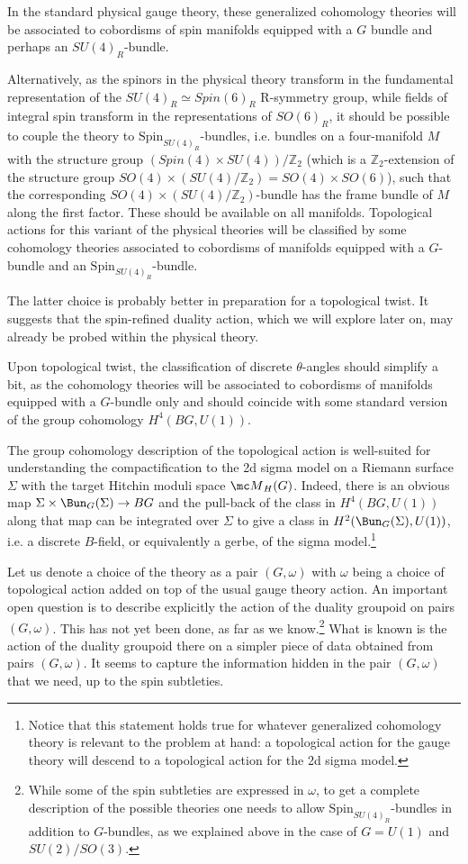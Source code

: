 \documentclass[11pt,reqno]{amsart}
\theoremstyle{plain}
\numberwithin{equation}{section}
\newcommand{\Z}{\mathbb{Z}}
\theoremstyle{definition}
\begin{document}
In the standard physical gauge theory, these generalized cohomology
theories will be associated to cobordisms of spin manifolds equipped
with a $G$ bundle and perhaps an $SU(4)_R$-bundle.

Alternatively, as the spinors in the physical theory transform in the
fundamental representation of the $SU(4)_R\simeq Spin(6)_R$ R-symmetry
group, while fields of integral spin transform in the representations
of $SO(6)_R$, it should be possible to couple the theory to
$\mathrm{Spin}_{SU(4)_R}$-bundles, i.e. bundles on a four-manifold $M$
with the structure group $(Spin(4) \times SU(4))/\Z_2$ (which is a
$\Z_2$-extension of the structure group $SO(4) \times (SU(4)/\Z_2) =
SO(4) \times SO(6)$), such that the corresponding $SO(4) \times
(SU(4)/\Z_2)$-bundle has the frame bundle of $M$ along the first
factor. These should be available on all manifolds.  Topological
actions for this variant of the physical theories will be classified
by some cohomology theories associated to cobordisms of manifolds
equipped with a $G$-bundle and an $\mathrm{Spin}_{SU(4)_R}$-bundle.

The latter choice is probably better in preparation for a topological
twist. It suggests that the spin-refined duality action, which we will
explore later on, may already be probed within the physical theory.

Upon topological twist, the classification of discrete $\theta$-angles
should simplify a bit, as the cohomology theories will be associated
to cobordisms of manifolds equipped with a $G$-bundle only and should
coincide with some standard version of the group cohomology
$H^4(BG,U(1))$.

The group cohomology description of the topological action is
well-suited for understanding the compactification to the 2d sigma
model on a Riemann surface $\Sigma$ with the target Hitchin moduli
space ${\mc M}_H(G)$. Indeed, there is an obvious map $\Sigma \times
\Bun_G(\Sigma) \to BG$ and the pull-back of the class in
$H^4(BG,U(1))$ along that map can be integrated over $\Sigma$ to give
a class in $H^2(\Bun_G(\Sigma),U(1))$, i.e. a discrete $B$-field, or
equivalently a gerbe, of the sigma model.\footnote{Notice that this
  statement holds true for whatever generalized cohomology theory is
  relevant to the problem at hand: a topological action for the gauge
  theory will descend to a topological action for the 2d sigma model.}

Let us denote a choice of the theory as a pair $(G, \omega)$ with
$\omega$ being a choice of topological action added on top of the
usual gauge theory action. An important open question is to describe
explicitly the action of the duality groupoid on pairs $(G,
\omega)$. This has not yet been done, as far as we
know.\footnote{While some of the spin subtleties are expressed in
  $\omega$, to get a complete description of the possible theories one
  needs to allow $\mathrm{Spin}_{SU(4)_R}$-bundles in addition to
  $G$-bundles, as we explained above in the case of $G=U(1)$ and
  $SU(2)/SO(3)$.} What is known is the action of the duality groupoid
there on a simpler piece of data obtained from pairs $(G, \omega)$. It
seems to capture the information hidden in the pair $(G, \omega)$ that
we need, up to the spin subtleties.
\end{document}
